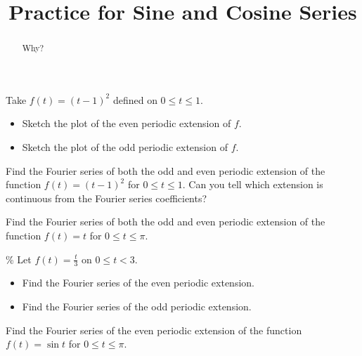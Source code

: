 \documentclass{ximera}
\title{Practice for Sine and Cosine Series}
\begin{document}
\begin{abstract}
Why?
\end{abstract}
\maketitle


\begin{exercise}
    Take $f(t) = {(t-1)}^2$ defined on $0 \leq t \leq 1$.
    \begin{itemize}
        \item Sketch the plot of the even periodic extension of $f$.
        \item Sketch the plot of the odd periodic extension of $f$.
    \end{itemize}
\end{exercise}

\begin{exercise}
    Find the Fourier series of both the odd and even periodic extension of the function $f(t) = {(t-1)}^2$ for $0 \leq t \leq 1$. Can you tell which extension is continuous from the Fourier series coefficients?
\end{exercise}

\begin{exercise}
    Find the Fourier series of both the odd and even periodic extension of the function $f(t) = t$ for $0 \leq t \leq \pi$.
\end{exercise}

\begin{exercise}\%
    Let $f(t) = \frac{t}{3}$ on $0 \leq t < 3$.
    \begin{itemize}
        \item Find the Fourier series of the even periodic extension.
        \item Find the Fourier series of the odd periodic extension.
    \end{itemize}
\end{exercise}

\begin{exercise}
    Find the Fourier series of the even periodic extension of the function $f(t) = \sin t$ for $0 \leq t \leq \pi$.
\end{exercise}
\end{document}
